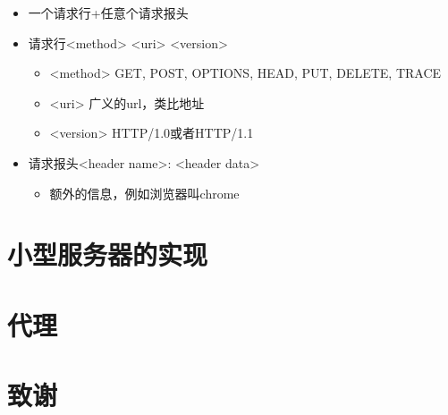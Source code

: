 \documentclass[12pt,AutoFakeBold,aspectratio=43,mathserif]{beamer}
\begin{document}
{\begin{frame}
        \begin{itemize}
            \item 一个请求行+任意个请求报头
            \item 请求行<method> <uri> <version>\begin{itemize}
                \item <method> GET, POST, OPTIONS, HEAD, PUT, DELETE, TRACE
                \item <uri> 广义的url，类比地址
                \item <version> HTTP/1.0或者HTTP/1.1
            \end{itemize}
            \item 请求报头<header name>: <header data>\begin{itemize}
                \item 额外的信息，例如浏览器叫chrome
            \end{itemize}
        \end{itemize}
    
    \end{frame}
    
    \section{小型服务器的实现}

    \section{代理}
    
    \section*{致谢}}
\end{document}
